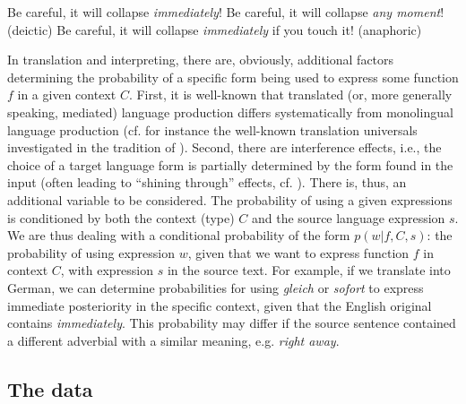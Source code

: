 \begin{exe}
  \ex
  \begin{xlist}
  \ex\label{ex4} Be careful, it will collapse \textit{immediately}!
  \ex\label{ex4b} Be careful, it will collapse \textit{any moment}! (deictic)
  \ex\label{ex5} Be careful, it will collapse \textit{immediately} if you touch
  it! (anaphoric)
\end{xlist}
\end{exe}
%
In translation and interpreting, there are, obviously, additional
factors determining the probability of a specific form being used to
express some function $f$ in a given context $C$. First, it is
well-known that translated (or, more generally speaking, mediated)
language production differs systematically from monolingual language
production (cf. for instance the well-known translation universals
investigated in the tradition of
\citealt{Baker1993,Baker1995}). Second, there are interference
effects, i.e., the choice of a target language form is partially
determined by the form found in the input (often leading to ``shining
through'' effects, cf. \citealt{Teich2003}). There is, thus, an
additional variable to be considered. The probability of using a given
expressions is conditioned by both the context (type) $C$ and the
source language expression $s$. We are thus dealing with a
conditional probability of the form $p(w|f,C,s)$: the probability of
using expression $w$, given that we want to express function $f$ in
context $C$, with expression $s$ in the source text. For example, if
we translate  into German, we can determine probabilities for
using \textit{gleich} or \textit{sofort} to express immediate
posteriority in the specific context, given that the English original
contains \textit{immediately}. This probability may differ if the
source sentence contained a different adverbial with a similar
meaning, e.g. \textit{right away}.

\subsection{The data}\label{sec:data}

